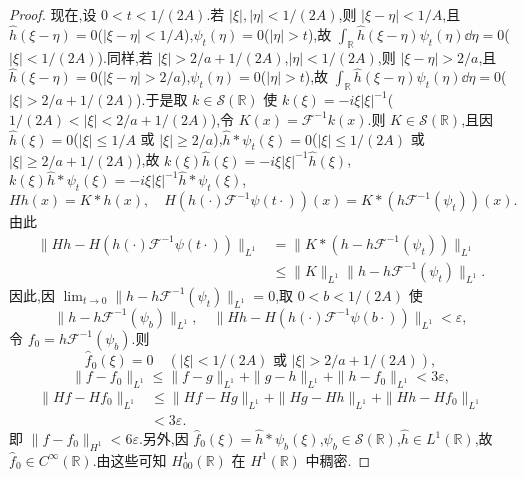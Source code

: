 \begin{proof}
现在,设 $0 < t < 1/(2A)$.若 $|\xi|, |\eta| < 1/(2A)$,则 $|\xi - \eta| < 1/A$,且 $\hat{h}(\xi - \eta) = 0$($|\xi - \eta| < 1/A$),$\psi_{t}(\eta) = 0$($|\eta| > t$),故 $\int_{\mathbb{R}}\hat{h}(\xi - \eta)\psi_{t}(\eta)\dd\eta = 0$($|\xi| < 1/(2A)$).同样,若 $|\xi| > 2/a + 1/(2A)$,$|\eta| < 1/(2A)$,则 $|\xi - \eta| > 2/a$,且 $\hat{h}(\xi - \eta) = 0$($|\xi - \eta| > 2/a$),$\psi_{t}(\eta) = 0$($|\eta| > t$),故 $\int_{\mathbb{R}}\hat{h}(\xi - \eta)\psi_{t}(\eta)\dd\eta = 0$($|\xi| > 2/a + 1/(2A)$).于是取 $k \in \mathcal{S}(\mathbb{R})$ 使 $k(\xi) = -i\xi|\xi|^{-1}$($1/(2A) < |\xi| < 2/a + 1/(2A)$),令 $K(x) = \mathcal{F}^{-1}k(x)$.则 $K \in \mathcal{S}(\mathbb{R})$,且因 $\hat{h}(\xi) = 0$($|\xi| \leq 1/A$ 或 $|\xi| \geq 2/a$),$\hat{h} * \psi_{t}(\xi) = 0$($|\xi| \leq 1/(2A)$ 或 $|\xi| \geq 2/a + 1/(2A)$),故 $k(\xi)\hat{h}(\xi) = -i\xi|\xi|^{-1}\hat{h}(\xi)$,$k(\xi)\hat{h} * \psi_{t}(\xi) = -i\xi|\xi|^{-1}\hat{h} * \psi_{t}(\xi)$,
\begin{equation*}
Hh(x) = K * h(x), \quad H\left(h(\cdot)\mathcal{F}^{-1}\psi(t\cdot)\right)(x) = K * \left(h\mathcal{F}^{-1}(\psi_{t})\right)(x).
\end{equation*}
由此
\begin{align*}
\| Hh - H\left(h(\cdot)\mathcal{F}^{-1}\psi(t\cdot)\right) \|_{L^{1}} & = \| K * \left(h - h\mathcal{F}^{-1}(\psi_{t})\right) \|_{L^{1}} \\
& \leq \| K \|_{L^{1}}\| h - h\mathcal{F}^{-1}(\psi_{t}) \|_{L^{1}}.
\end{align*}
因此,因 $\lim_{t \to 0}\| h - h\mathcal{F}^{-1}(\psi_{t}) \|_{L^{1}} = 0$,取 $0 < b < 1/(2A)$ 使
\begin{equation*}
\| h - h\mathcal{F}^{-1}(\psi_{b}) \|_{L^{1}}, \quad \| Hh - H\left(h(\cdot)\mathcal{F}^{-1}\psi(b\cdot)\right) \|_{L^{1}} < \varepsilon,
\end{equation*}
令 $f_{0} = h\mathcal{F}^{-1}(\psi_{b})$.则
\begin{equation*}
\hat{f}_{0}(\xi) = 0 \quad \left(|\xi| < 1/(2A) \text{ 或 } |\xi| > 2/a + 1/(2A)\right),
\end{equation*}
\begin{equation*}
\| f - f_{0} \|_{L^{1}} \leq \| f - g \|_{L^{1}} + \| g - h \|_{L^{1}} + \| h - f_{0} \|_{L^{1}} < 3\varepsilon,
\end{equation*}
\begin{align*}
\| Hf - Hf_{0} \|_{L^{1}} &\leq \| Hf - Hg \|_{L^{1}} + \| Hg - Hh \|_{L^{1}} + \| Hh - Hf_{0} \|_{L^{1}} \\
&< 3\varepsilon.
\end{align*}
即 $\| f - f_{0} \|_{H^{1}} < 6\varepsilon$.另外,因 $\hat{f}_{0}(\xi) = \hat{h} * \psi_{b}(\xi)$,$\psi_{b} \in \mathcal{S}(\mathbb{R})$,$\hat{h} \in L^{1}(\mathbb{R})$,故 $\hat{f}_{0} \in C^{\infty}(\mathbb{R})$.由这些可知 $H_{00}^{1}(\mathbb{R})$ 在 $H^{1}(\mathbb{R})$ 中稠密.
\end{proof}

